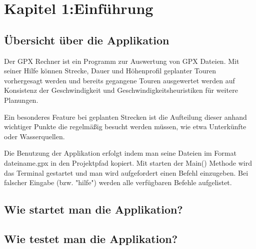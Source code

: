 \section{Kapitel 1:Einführung}


\subsection{Übersicht über die Applikation}

Der GPX Rechner ist ein Programm zur Auswertung von GPX Dateien. Mit seiner Hilfe können Strecke, Dauer und Höhenprofil geplanter Touren vorhergesagt werden und bereits gegangene Touren ausgewertet werden auf Konsistenz der Geschwindigkeit und Geschwindigkeitsheuristiken für weitere Planungen.

Ein besonderes Feature bei geplanten Strecken ist die Aufteilung dieser anhand wichtiger Punkte die regelmäßig besucht werden müssen, wie etwa Unterkünfte oder Wasserquellen.

Die Benutzung der Applikation erfolgt indem man seine Dateien im Format dateiname.gpx in den Projektpfad kopiert. Mit starten der Main() Methode wird das Terminal gestartet und man wird aufgefordert einen Befehl einzugeben. Bei falscher Eingabe (bzw. "hilfe") werden alle verfügbaren Befehle aufgelistet.



\subsection{Wie startet man die Applikation?}


\subsection{Wie testet man die Applikation?}